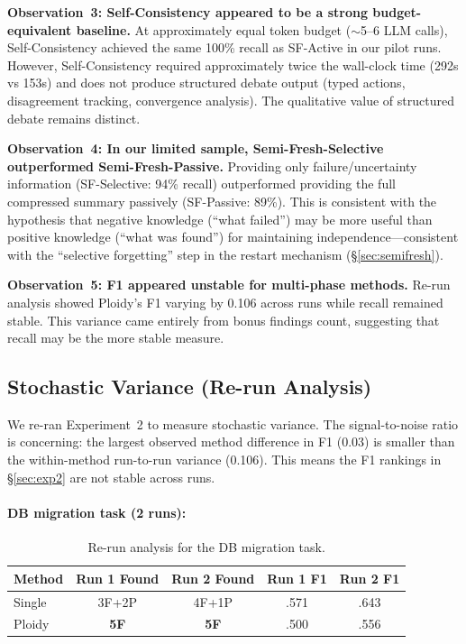 \documentclass[11pt]{article}
\begin{document}
\textbf{Observation~3: Self-Consistency appeared to be a strong budget-equivalent baseline.} At approximately equal token budget ($\sim$5--6 LLM calls), Self-Consistency achieved the same 100\% recall as SF-Active in our pilot runs. However, Self-Consistency required approximately twice the wall-clock time (292s vs 153s) and does not produce structured debate output (typed actions, disagreement tracking, convergence analysis). The qualitative value of structured debate remains distinct.

\textbf{Observation~4: In our limited sample, Semi-Fresh-Selective outperformed Semi-Fresh-Passive.} Providing only failure/uncertainty information (SF-Selective: 94\% recall) outperformed providing the full compressed summary passively (SF-Passive: 89\%). This is consistent with the hypothesis that negative knowledge (``what failed'') may be more useful than positive knowledge (``what was found'') for maintaining independence---consistent with the ``selective forgetting'' step in the restart mechanism (\S\ref{sec:semifresh}).

\textbf{Observation~5: F1 appeared unstable for multi-phase methods.} Re-run analysis showed Ploidy's F1 varying by 0.106 across runs while recall remained stable. This variance came entirely from bonus findings count, suggesting that recall may be the more stable measure.

\subsection{Stochastic Variance (Re-run Analysis)}
\label{sec:rerun}

We re-ran Experiment~2 to measure stochastic variance. The signal-to-noise ratio is concerning: the largest observed method difference in F1 (0.03) is smaller than the within-method run-to-run variance (0.106). This means the F1 rankings in \S\ref{sec:exp2} are not stable across runs.

\paragraph{DB migration task (2 runs):}

\begin{table}[H]
\centering
\caption{Re-run analysis for the DB migration task.}
\label{tab:rerun}
\small
\begin{tabular}{@{}lcccc@{}}
\toprule
\textbf{Method} & \textbf{Run 1 Found} & \textbf{Run 2 Found} & \textbf{Run 1 F1} & \textbf{Run 2 F1} \\
\midrule
Single & 3F+2P & 4F+1P & .571 & .643 \\
Ploidy & \textbf{5F} & \textbf{5F} & .500 & .556 \\
\bottomrule
\end{tabular}
\end{table}
\end{document}
